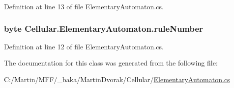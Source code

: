 Definition at line 13 of file Elementary\+Automaton.\+cs.

\hypertarget{class_cellular_1_1_elementary_automaton_aa9221b2c09faebf1dd67ba75194b15f8}{}
\subsubsection[{rule\+Number}]{\setlength{\rightskip}{0pt plus 5cm}byte Cellular.\+Elementary\+Automaton.\+rule\+Number\hspace{0.3cm}{\ttfamily [protected]}}\label{class_cellular_1_1_elementary_automaton_aa9221b2c09faebf1dd67ba75194b15f8}


Definition at line 12 of file Elementary\+Automaton.\+cs.



The documentation for this class was generated from the following file\+:\begin{DoxyCompactItemize}
\item 
C\+:/\+Martin/\+M\+F\+F/\+\_\+baka/\+Martin\+Dvorak/\+Cellular/\hyperlink{_elementary_automaton_8cs}{Elementary\+Automaton.\+cs}\end{DoxyCompactItemize}
